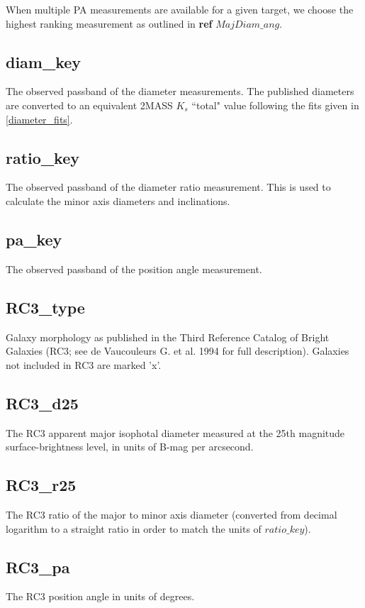 \documentclass[iop]{emulateapj-rtx4}
\begin{document}
When multiple PA measurements are available for a given target, we choose the highest ranking measurement as outlined in \textbf{ref} $MajDiam\_ang$.

\subsection{diam\_key} \label{diameter_key}
The observed passband of the diameter measurements. The published diameters are converted to an equivalent 2MASS $K_s$ ``total" value following the fits given in \ref{diameter_fits}.

\subsection{ratio\_key} \label{ratio_key}
The observed passband of the diameter ratio measurement. This is used to calculate the minor axis diameters and inclinations.

\subsection{pa\_key} \label{pa_key}
The observed passband of the position angle measurement.

\subsection{RC3\_type}
Galaxy morphology as published in the Third Reference Catalog of Bright Galaxies (RC3; see de Vaucouleurs G. et al. 1994 for full description). Galaxies not included in RC3 are marked 'x'.

\subsection{RC3\_d25}
The RC3 apparent major isophotal diameter measured at the 25th magnitude surface-brightness level, in units of B-mag per arcsecond.

\subsection{RC3\_r25}
The RC3 ratio of the major to minor axis diameter (converted from decimal logarithm to a straight ratio in order to match the units of $ratio\_key$). 

\subsection{RC3\_pa}
The RC3 position angle in units of degrees.
\end{document}
